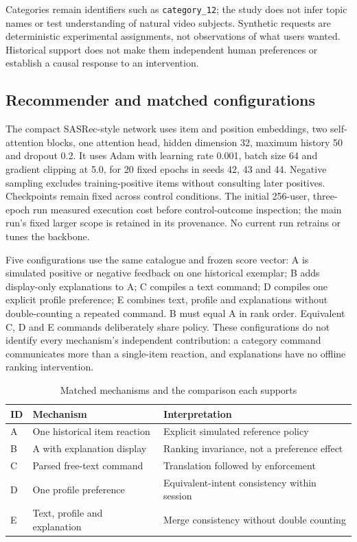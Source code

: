 \documentclass[conference]{IEEEtran}
\begin{document}
Categories remain identifiers such as \texttt{category\_12}; the study does not infer topic names or test understanding of natural video subjects. Synthetic requests are deterministic experimental assignments, not observations of what users wanted. Historical support does not make them independent human preferences or establish a causal response to an intervention.

\subsection{Recommender and matched configurations}
The compact SASRec-style network uses item and position embeddings, two self-attention blocks, one attention head, hidden dimension 32, maximum history 50 and dropout 0.2. It uses Adam with learning rate 0.001, batch size 64 and gradient clipping at 5.0, for 20 fixed epochs in seeds 42, 43 and 44. Negative sampling excludes training-positive items without consulting later positives. Checkpoints remain fixed across control conditions. The initial 256-user, three-epoch run measured execution cost before control-outcome inspection; the main run's fixed larger scope is retained in its provenance. No current run retrains or tunes the backbone.

Five configurations use the same catalogue and frozen score vector: A is simulated positive or negative feedback on one historical exemplar; B adds display-only explanations to A; C compiles a text command; D compiles one explicit profile preference; E combines text, profile and explanations without double-counting a repeated command. B must equal A in rank order. Equivalent C, D and E commands deliberately share policy. These configurations do not identify every mechanism's independent contribution: a category command communicates more than a single-item reaction, and explanations have no offline ranking intervention.

\begin{table}[t]\centering\small
\caption{Matched mechanisms and the comparison each supports}
\begin{tabular}{p{0.4cm}p{2.6cm}p{3.9cm}}\toprule
ID&Mechanism&Interpretation\\\midrule
A&One historical item reaction&Explicit simulated reference policy\\
B&A with explanation display&Ranking invariance, not a preference effect\\
C&Parsed free-text command&Translation followed by enforcement\\
D&One profile preference&Equivalent-intent consistency within session\\
E&Text, profile and explanation&Merge consistency without double counting\\\bottomrule
\end{tabular}\end{table}
\end{document}
